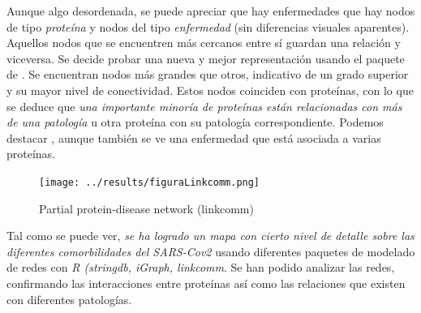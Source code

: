 Aunque algo desordenada, se puede apreciar que hay enfermedades que hay nodos de tipo \textit{proteína} y nodos del tipo \textit{enfermedad} (sin diferencias visuales aparentes). Aquellos nodos que se encuentren más cercanos entre sí guardan una relación y viceversa. Se decide probar una nueva y mejor representación usando el paquete  de . Se encuentran nodos más grandes que otros, indicativo de un grado superior y su mayor nivel de conectividad. Estos nodos coinciden con proteínas, con lo que se deduce que \emph{una importante minoría de proteínas están relacionadas con más de una patología} u otra proteína con su patología correspondiente. Podemos destacar , aunque también se ve una enfermedad que está asociada a varias proteínas.

	\begin{figure}[h!]
		\texttt{[image: ../results/figuraLinkcomm.png]}
		\caption{Partial protein-disease network (linkcomm)}
		\label{fig:ppi_linkcomm}
	\end{figure}
	
Tal como se puede ver, \emph{se ha logrado un mapa con cierto nivel de detalle sobre las diferentes comorbilidades del SARS-Cov2} usando diferentes paquetes de modelado de redes con \textit{R (stringdb, iGraph, linkcomm}. Se han podido analizar las redes, confirmando las interacciones entre proteínas así como las relaciones que existen con diferentes patologías.